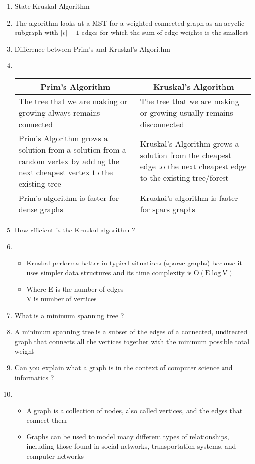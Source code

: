 ﻿\documentclass{article}
\newcommand{\answer}{\item [$\rightarrow$]}
\begin{document}
\begin{enumerate}[label=\arabic*. ]
		\item State Kruskal Algorithm
		\answer The algorithm looks at a MST for a weighted connected graph as an acyclic subgraph with $|v|-1$
			edges for which the sum of edge weights is the smallest

		\item Difference between Prim's and Kruskal's Algorithm
		\answer ~ \vspace{-2em}
			\begin{center}
				\begin{tabular}{|p{.4\columnwidth}|p{}|} \hline
					\multicolumn{1}{|c|}{Prim's Algorithm} &
					\multicolumn{1}{|c|}{Kruskal's Algorithm} \\ \hline
					The tree that we are making or growing always remains connected &
					The tree that we are making or growing usually remains disconnected \\ \hline
					Prim's Algorithm grows a solution from a solution from a random vertex
					by adding the next cheapest vertex to the existing tree &
					Kruskal's Algorithm grows a solution from the cheapest edge to the next cheapest
					edge to the existing tree/forest \\ \hline
					Prim's algorithm is faster for dense graphs &
					Kruskai's algorithm is faster for spars graphs \\ \hline
				\end{tabular}
			\end{center}

		\item How efficient is the Kruskal algorithm ?
		\answer
			\begin{itemize}[label=$\ast$]
				\item Kruskal performs better in typical situations (sparse graphs) because it uses
					simpler data structures and its time complexity is
					$\text{O}(\text{E}\log\text{V})$
				\item Where E is the number of edges \\ V is number of vertices
			\end{itemize}

		\item What is a minimum spanning tree ?
		\answer A minimum spanning tree is a subset of the edges of a connected, undirected graph that connects
			all the vertices together with the minimum possible total weight

		\item Can you explain what a graph is in the context of computer science and informatics ?
		\answer
			\begin{itemize}[label=$\ast$]
				\item A graph is a collection of nodes, also called vertices, and the edges that connect
					them
				\item Graphs can be used to model many different types of relationships, including those
					found in social networks, transportation systems, and computer networks
			\end{itemize}


\end{enumerate}
\end{document}
